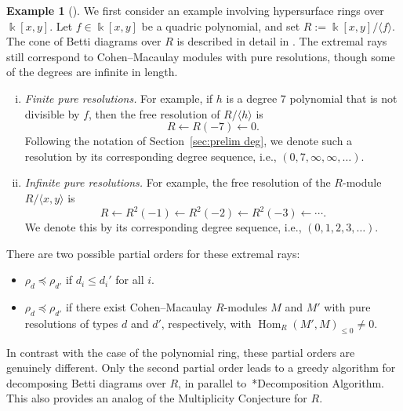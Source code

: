\documentclass[12pt]{amsart}
\theoremstyle{definition}
\newtheorem{eg}[equation]{Example}
\newenvironment{example}[1][]{\begin{eg}[#1] \pushQED{\qed}}{\popQED \end{eg}}
\def\<{\langle}
\def\>{\rangle}
\newcommand{\Hom}{\operatorname{Hom}}
\begin{document}
\begin{example}\label{ex:hypersurface}
  We first consider an example involving hypersurface rings over
  $\Bbbk[x,y]$. Let $f\in \Bbbk[x,y]$ be a quadric polynomial, and set
  $R:=\Bbbk[x,y]/\<f\>$.  The cone of Betti diagrams over $R$ is
  described in detail in \cite{bbeg}.  The extremal rays still
  correspond to Cohen--Macaulay modules with pure resolutions, though
  some of the degrees are infinite in length.
  
  \begin{enumerate}[(i)]
  \item \emph{Finite pure resolutions.}  For example, if $h$ is a
    degree $7$ polynomial that is not divisible by $f$, then the free
    resolution of $R/\<h\>$ is \[ R\leftarrow R(-7) \leftarrow 0.\]
    Following the notation of Section~\ref{sec:prelim deg}, we denote
    such a resolution by its corresponding degree sequence, i.e.,
    $(0,7,\infty,\infty,\dots)$.
\item 
  \emph{Infinite pure resolutions.}  
  For example, the free resolution of the $R$-module $R/\<x,y\>$ is
  \[
  R\leftarrow R^2(-1)\leftarrow R^2(-2)\leftarrow R^2(-3)\leftarrow
  \cdots.
  \]
  We denote this by its corresponding degree sequence, i.e.,
  $(0,1,2,3,\dots)$.
\end{enumerate}

There are two possible partial orders for these extremal rays:
\begin{itemize}
\item $\rho_d\preceq \rho_{d'}$ if $d_i\leq d_i'$ for all $i$.
\item $\rho_d\preceq\rho_{d'}$ if there exist Cohen--Macaulay
  $R$-modules $M$ and $M'$ with pure resolutions of types $d$ and
  $d'$, respectively, with $\Hom_R(M',M)_{\leq 0}\ne 0$.
\end{itemize}
In contrast with the case of the polynomial ring, these partial orders are genuinely different.  Only the second partial order leads to a greedy algorithm for decomposing Betti diagrams over $R$, in parallel to~\cite{EiScConjOfBS07}*{Decomposition Algorithm}.  This also provides an analog of the Multiplicity Conjecture for $R$.
\end{example}
\end{document}
